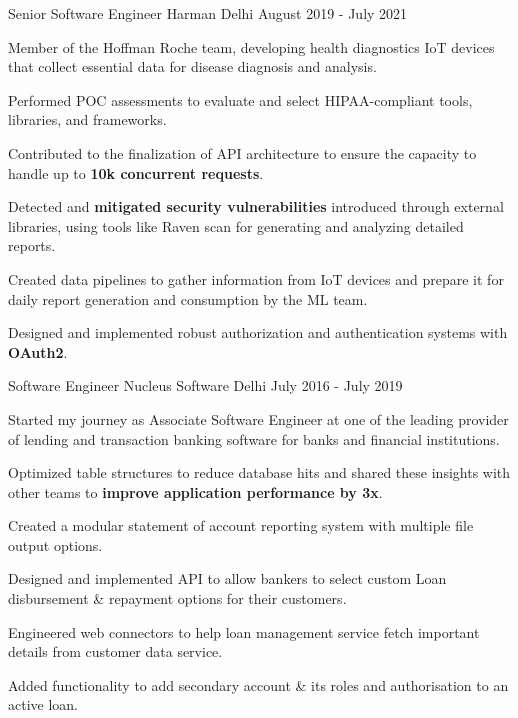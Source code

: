 \begin{cventries}
  \cventry
    {Senior Software Engineer} %
    {Harman} %
    {Delhi} %
    {August 2019 - July 2021} %
    {
      \begin{cvitems} %
        \item {Member of the Hoffman Roche team, developing health diagnostics IoT devices that collect essential data for disease diagnosis and analysis.}
        \item {Performed POC assessments to evaluate and select HIPAA-compliant tools, libraries, and frameworks.}
        \item {Contributed to the finalization of API architecture to ensure the capacity to handle up to \textbf{10k concurrent requests}.}
        \item {Detected and \textbf{mitigated security vulnerabilities} introduced through external libraries, using tools like Raven scan for generating and analyzing detailed reports.}
        \item {Created data pipelines to gather information from IoT devices and prepare it for daily report generation and consumption by the ML team.}
        \item {Designed and implemented robust authorization and authentication systems with \textbf{OAuth2}.}
      \end{cvitems}
    }

  \cventry
    {Software Engineer} %
    {Nucleus Software} %
    {Delhi} %
    {July 2016 - July 2019} %
    {
      \begin{cvitems} %
        \item {Started my journey as Associate Software Engineer at one of the leading provider of lending and transaction banking software for banks and financial institutions.}
        \item {Optimized table structures to reduce database hits and shared these insights with other teams to \textbf{improve application performance by 3x}.}
        \item {Created a modular statement of account reporting system with multiple file output options.}
        \item {Designed and implemented API to allow bankers to select custom Loan disbursement \& repayment options for their customers.}
        \item {Engineered web connectors to help loan management service fetch important details from customer data service.}
        \item {Added functionality to add secondary account \& its roles and authorisation to an active loan.}
      \end{cvitems}
    }

\end{cventries}